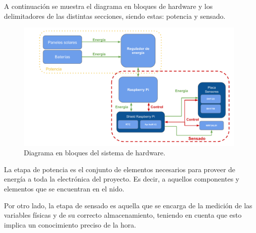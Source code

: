 A continuación se muestra el diagrama en bloques de hardware y los delimitadores de las distintas secciones, siendo estas: potencia y sensado.

\begin{figure}[H]
	\centering
	\includegraphics[width=\textwidth]{ImagenesIngenieria de Detalle/DiagramaHardwareMarcado}		
	\caption{Diagrama en bloques del sistema de hardware.}
	\label{fig:diagrama_hardware}
\end{figure}

La etapa de potencia es el conjunto de elementos necesarios para proveer de energía a toda la electrónica del proyecto. Es decir, a aquellos componentes y elementos que se encuentran en el nido.


Por otro lado, la etapa de sensado es aquella que se encarga de la medición de las variables físicas y de su correcto almacenamiento, teniendo en cuenta que esto implica un conocimiento preciso de la hora.
